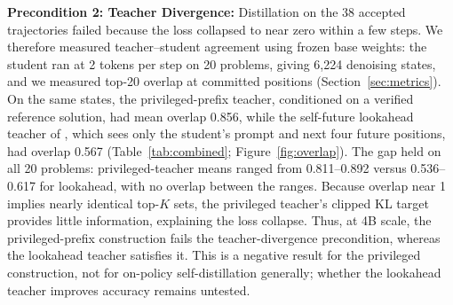 \documentclass{article}
\begin{document}
\textbf{Precondition 2: Teacher Divergence:} Distillation on the 38 accepted trajectories failed because the loss collapsed to near zero within a few steps. We therefore measured teacher--student agreement using frozen base weights: the student ran at 2 tokens per step on 20 problems, giving 6,224 denoising states, and we measured top-20 overlap at committed positions (Section~\ref{sec:metrics}). On the same states, the privileged-prefix teacher, conditioned on a verified reference solution, had mean overlap 0.856, while the self-future lookahead teacher of \citet{dopsd2026}, which sees only the student's prompt and next four future positions, had overlap 0.567 (Table~\ref{tab:combined}; Figure~\ref{fig:overlap}). The gap held on all 20 problems: privileged-teacher means ranged from 0.811--0.892 versus 0.536--0.617 for lookahead, with no overlap between the ranges. Because overlap near 1 implies nearly identical top-$K$ sets, the privileged teacher's clipped KL target provides little information, explaining the loss collapse. Thus, at 4B scale, the privileged-prefix construction fails the teacher-divergence precondition, whereas the lookahead teacher satisfies it. This is a negative result for the privileged construction, not for on-policy self-distillation generally; whether the lookahead teacher improves accuracy remains untested.
\end{document}
